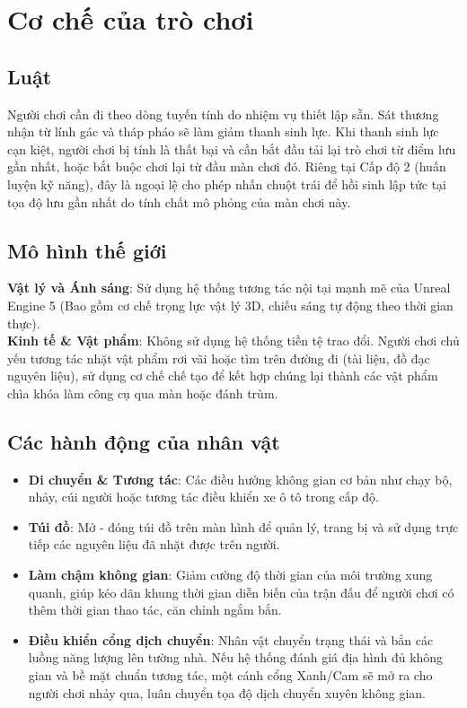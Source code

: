 \documentclass[../DoAn.tex]{subfiles}
\begin{document}
\section{Cơ chế của trò chơi}

\subsection{Luật}
Người chơi cần đi theo dòng tuyến tính do nhiệm vụ thiết lập sẵn. Sát thương nhận từ lính gác và tháp pháo sẽ làm giảm thanh sinh lực. Khi thanh sinh lực cạn kiệt, người chơi bị tính là thất bại và cần bắt đầu tải lại trò chơi từ điểm lưu gần nhất, hoặc bắt buộc chơi lại từ đầu màn chơi đó. Riêng tại Cấp độ 2 (huấn luyện kỹ năng), đây là ngoại lệ cho phép nhấn chuột trái để hồi sinh lập tức tại tọa độ lưu gần nhất do tính chất mô phỏng của màn chơi này.

\subsection{Mô hình thế giới}
\textbf{Vật lý và Ánh sáng}: Sử dụng hệ thống tương tác nội tại mạnh mẽ của Unreal Engine 5 (Bao gồm cơ chế trọng lực vật lý 3D, chiếu sáng tự động theo thời gian thực).
\\
\textbf{Kinh tế \& Vật phẩm}: Không sử dụng hệ thống tiền tệ trao đổi. Người chơi chủ yếu tương tác nhặt vật phẩm rơi vãi hoặc tìm trên đường đi (tài liệu, đồ đạc nguyên liệu), sử dụng cơ chế chế tạo để kết hợp chúng lại thành các vật phẩm chìa khóa làm công cụ qua màn hoặc đánh trùm.

\subsection{Các hành động của nhân vật}
\begin{itemize}
    \item \textbf{Di chuyển \& Tương tác}: Các điều hướng không gian cơ bản như chạy bộ, nhảy, cúi người hoặc tương tác điều khiển xe ô tô trong cấp độ.
    \item \textbf{Túi đồ}: Mở - đóng túi đồ trên màn hình để quản lý, trang bị và sử dụng trực tiếp các nguyên liệu đã nhặt được trên người.
    \item \textbf{Làm chậm không gian}: Giảm cường độ thời gian của môi trường xung quanh, giúp kéo dãn khung thời gian diễn biến của trận đấu để người chơi có thêm thời gian thao tác, căn chỉnh ngắm bắn.
    \item \textbf{Điều khiển cổng dịch chuyển}: Nhân vật chuyển trạng thái và bắn các luồng năng lượng lên tường nhà. Nếu hệ thống đánh giá địa hình đủ không gian và bề mặt chuẩn tương tác, một cánh cổng Xanh/Cam sẽ mở ra cho người chơi nhảy qua, luân chuyển tọa độ dịch chuyển xuyên không gian.
\end{itemize}
\end{document}
